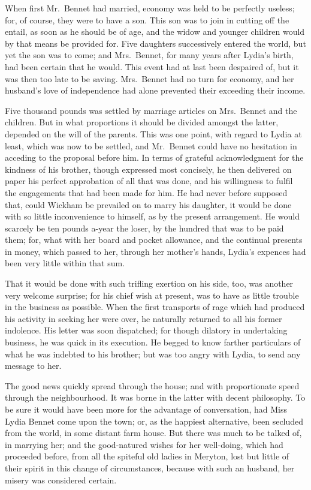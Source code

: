 When first Mr.\ Bennet had married, economy was held
to be perfectly useless; for, of course, they were to have
a son. This son was to join in cutting off the entail, as
soon as he should be of age, and the widow and younger
children would by that means be provided for. Five
daughters successively entered the world, but yet the son
was to come; and Mrs.\ Bennet, for many years after
Lydia’s birth, had been certain that he would. This event
had at last been despaired of, but it was then too late to
be saving. Mrs.\ Bennet had no turn for economy, and her
husband’s love of independence had alone prevented their
exceeding their income.

Five thousand pounds was settled by marriage articles
on Mrs.\ Bennet and the children. But in what proportions
it should be divided amongst the latter, depended
on the will of the parents. This was one point, with
regard to Lydia at least, which was now to be settled,
and Mr.\ Bennet could have no hesitation in acceding to
the proposal before him. In terms of grateful acknowledgment
for the kindness of his brother, though expressed
most concisely, he then delivered on paper his perfect
approbation of all that was done, and his willingness to
fulfil the engagements that had been made for him. He
had never before supposed that, could Wickham be prevailed
on to marry his daughter, it would be done with
so little inconvenience to himself, as by the present
arrangement. He would scarcely be ten pounds a-year
the loser, by the hundred that was to be paid them;
for, what with her board and pocket allowance, and the
continual presents in money, which passed to her, through
her mother’s hands, Lydia’s expences had been very little
within that sum.

That it would be done with such trifling exertion on
his side, too, was another very welcome surprise; for his
chief wish at present, was to have as little trouble in the
business as possible. When the first transports of rage
which had produced his activity in seeking her were over,
he naturally returned to all his former indolence. His
letter was soon dispatched; for though dilatory in undertaking
business, he was quick in its execution. He begged
to know farther particulars of what he was indebted to
his brother; but was too angry with Lydia, to send any
message to her.

The good news quickly spread through the house; and
with proportionate speed through the neighbourhood. It
was borne in the latter with decent philosophy. To be
sure it would have been more for the advantage of conversation,
had Miss Lydia Bennet come upon the town;
or, as the happiest alternative, been secluded from the
world, in some distant farm house. But there was much
to be talked of, in marrying her; and the good-natured
wishes for her well-doing, which had proceeded before,
from all the spiteful old ladies in Meryton, lost but
little of their spirit in this change of circumstances,
because with such an husband, her misery was considered
certain.

